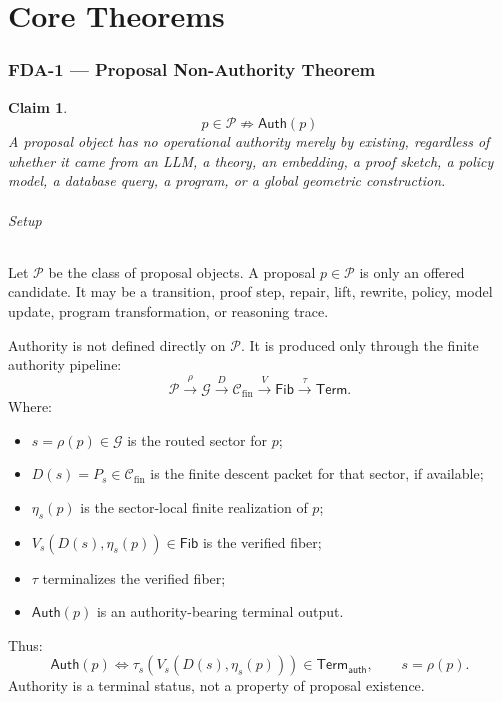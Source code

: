 \documentclass[11pt]{article}
\newtheorem{claim}[theorem]{Claim}
\begin{document}
\part{Core Theorems}

\section{FDA-1 — Proposal Non-Authority Theorem}

\begin{claim}
\[
\boxed{
p\in\mathcal P \not\Rightarrow \mathsf{Auth}(p)
}
\]
A proposal object has no operational authority merely by existing, regardless of whether it came from an LLM, a theory, an embedding, a proof sketch, a policy model, a database query, a program, or a global geometric construction.
\end{claim}

\paragraph{Setup}
Let \(\mathcal P\) be the class of proposal objects. A proposal \(p\in\mathcal P\) is only an offered candidate. It may be a transition, proof step, repair, lift, rewrite, policy, model update, program transformation, or reasoning trace.

Authority is not defined directly on \(\mathcal P\). It is produced only through the finite authority pipeline:
\[
\mathcal P \xrightarrow{\rho} \mathcal G \xrightarrow{D} \mathcal C_{\mathrm{fin}} \xrightarrow{V} \mathsf{Fib} \xrightarrow{\tau} \mathsf{Term}.
\]
Where:
\begin{itemize}
    \item \(s=\rho(p)\in\mathcal G\) is the routed sector for \(p\);
    \item \(D(s)=P_s\in\mathcal C_{\mathrm{fin}}\) is the finite descent packet for that sector, if available;
    \item \(\eta_s(p)\) is the sector-local finite realization of \(p\);
    \item \(V_s(D(s),\eta_s(p))\in\mathsf{Fib}\) is the verified fiber;
    \item \(\tau\) terminalizes the verified fiber;
    \item \(\mathsf{Auth}(p)\) is an authority-bearing terminal output.
\end{itemize}

Thus:
\[
\mathsf{Auth}(p) \iff \tau_s(V_s(D(s),\eta_s(p)))\in\mathsf{Term}_{\mathsf{auth}}, \qquad s=\rho(p).
\]
Authority is a terminal status, not a property of proposal existence.
\end{document}
